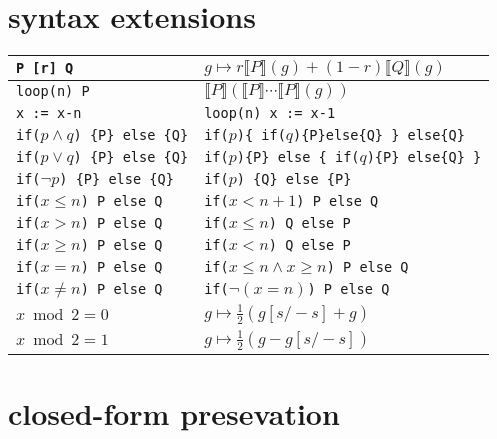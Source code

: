 \documentclass{article}
\renewcommand{\S}[1]{ \llbracket #1 \rrbracket }
\begin{document}
\newpage
\section{syntax extensions}

\begin{tabular}{ll}
	\hline
	\texttt{P [r] Q}                           & \(g\mapsto r\S{P}(g) + (1-r)\S{Q}(g)\)                      \\
	\hline
	\texttt{loop(n) P}                         & \(\S{P}(\S{P}\cdots \S{P}(g))\)                             \\
	\texttt{x := x-n}                          & \texttt{loop(n) x := x-1}                                   \\
	\hline
	\texttt{if(\(p\land q\)) \{P\} else \{Q\}} & \texttt{if(\(p\))\{ if(\(q\))\{P\}else\{Q\} \} else\{Q\}}   \\
	\texttt{if(\(p\lor q\)) \{P\} else \{Q\}}  & \texttt{if(\(p\))\{P\} else \{ if(\(q\))\{P\} else\{Q\} \}} \\
	\texttt{if(\(\lnot p\)) \{P\} else \{Q\}}  & \texttt{if(\(p\)) \{Q\} else \{P\}}                         \\
	\hline
	\texttt{if(\(x\leq n\))  P else Q}         & \texttt{if(\(x<n+1\)) P else Q}                             \\
	\texttt{if(\(x> n\))     P else Q}         & \texttt{if(\(x\leq n\)) Q else P}                           \\
	\texttt{if(\(x\geq n\))  P else Q}         & \texttt{if(\(x<n\)) Q else P}                               \\
	\texttt{if(\(x =  n\))   P else Q}         & \texttt{if(\(x\leq n \land x \geq n\)) P else Q}            \\
	\texttt{if(\(x \neq n\)) P else Q}         & \texttt{if(\(\lnot (x=n)\)) P else Q}                       \\
	\hline
	\(x \bmod 2 = 0\)                          & \(g\mapsto \frac12(g[s/-s] + g)\)                           \\
	\(x \bmod 2 = 1\)                          & \(g\mapsto \frac12(g - g[s/-s])\)                           \\
	\hline
\end{tabular}

\section{closed-form presevation}
\end{document}
